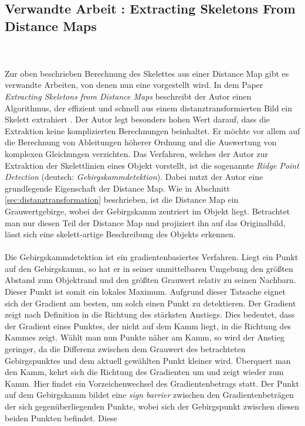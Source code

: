 \subsection{Verwandte Arbeit \cite{extracting_skeletons_distancemaps}: Extracting Skeletons From Distance Maps}
\\\\ 
Zur oben beschrieben Berechnung des Skelettes aus einer Distance Map gibt es verwandte Arbeiten, von denen nun eine vorgestellt wird. 
In dem Paper \emph{Extracting Skeletons from Distance Maps} beschreibt der Autor einen Algorithmus, der effizient und schnell
aus einem distanztransformierten Bild ein Skelett extrahiert \cite{extracting_skeletons_distancemaps}. Der Autor legt besonders hohen Wert darauf, dass die Extraktion keine komplizierten Berechnungen beinhaltet. Er möchte vor allem auf die Berechnung
von Ableitungen höherer Ordnung und die Auswertung von komplexen Gleichungen verzichten. Das Verfahren, welches der Autor zur 
Extraktion der Skelettlinien eines Objekt vorstellt, ist die sogenannte \emph{Ridge Point Detection} (deutsch: \emph{Gebirgskammdetektion}). Dabei nutzt der Autor eine grundlegende Eigenschaft der Distance Map. Wie in Abschnitt \ref{sec:distanztransformation} beschrieben, ist die Distance Map ein Grauwertgebirge, wobei der Gebirgskamm zentriert im Objekt liegt. Betrachtet man nur diesen Teil der Distance Map und projiziert ihn auf das Originalbild, 
lässt sich eine skelett-artige Beschreibung des Objekts erkennen.\\\\
Die Gebirgskammdetektion ist ein gradientenbasiertes Verfahren. Liegt ein Punkt auf den Gebirgskamm, so hat er in 
seiner unmittelbaren Umgebung den größten Abstand zum Objektrand und den größten Grauwert relativ zu seinen Nachbarn. Dieser Punkt ist somit ein lokales Maximum. Aufgrund dieser Tatsache eignet  sich der Gradient am besten, um solch einen Punkt zu detektieren. Der Gradient zeigt nach Definition in die Richtung des stärksten Anstiegs. Dies bedeutet, dass der Gradient eines Punktes, der nicht auf dem Kamm liegt, in die Richtung des Kammes zeigt. Wählt man nun Punkte näher am Kamm, so wird der Anstieg
geringer, da die Differenz zwischen dem Grauwert des betrachteten Gebirgspunktes und dem aktuell gewählten Punkt kleiner wird. Überquert man den Kamm, kehrt sich die Richtung des Gradienten um und zeigt wieder zum Kamm. Hier findet ein Vorzeichenwechsel des Gradientenbetrags statt. Der Punkt auf dem Gebirgskamm bildet eine \emph{sign barrier} zwischen den Gradientenbeträgen der sich gegenüberliegenden Punkte, wobei sich der Gebirgspunkt zwischen diesen beiden Punkten befindet. Diese
